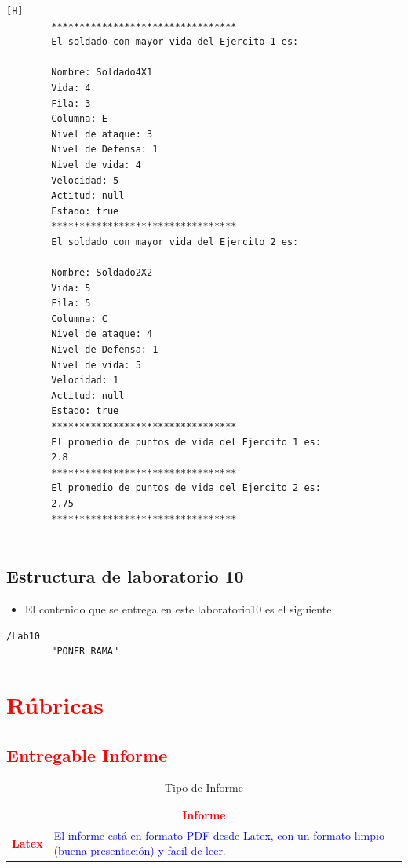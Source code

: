 \documentclass{article}
\begin{document}
	\begin{lstlisting}[language=bash,caption={Ejecucion:}][H]
		*********************************
		El soldado con mayor vida del Ejercito 1 es: 
		
		Nombre: Soldado4X1
		Vida: 4
		Fila: 3
		Columna: E
		Nivel de ataque: 3
		Nivel de Defensa: 1
		Nivel de vida: 4
		Velocidad: 5
		Actitud: null
		Estado: true
		*********************************
		El soldado con mayor vida del Ejercito 2 es: 
		
		Nombre: Soldado2X2
		Vida: 5
		Fila: 5
		Columna: C
		Nivel de ataque: 4
		Nivel de Defensa: 1
		Nivel de vida: 5
		Velocidad: 1
		Actitud: null
		Estado: true
		*********************************
		El promedio de puntos de vida del Ejercito 1 es: 
		2.8
		*********************************
		El promedio de puntos de vida del Ejercito 2 es: 
		2.75
		*********************************
		
	\end{lstlisting}
	\subsection{Estructura de laboratorio 10}
	\begin{itemize}	
		\item El contenido que se entrega en este laboratorio10 es el siguiente:
	\end{itemize}
	\begin{lstlisting}[style=ascii-tree]
	/Lab10	
		"PONER RAMA"

	\end{lstlisting}    
	\section{\textcolor{red}{Rúbricas}}
	
	\subsection{\textcolor{red}{Entregable Informe}}
	\begin{table}[H]
		\caption{Tipo de Informe}
		\setlength{\tabcolsep}{0.5em} %
		{\renewcommand{\arraystretch}{1.5}%
		\begin{tabular}{|p{3cm}|p{12cm}|}
			\hline
			\multicolumn{2}{|c|}{\textbf{\textcolor{red}{Informe}}}  \\
			\hline 
			\textbf{\textcolor{red}{Latex}} & \textcolor{blue}{El informe está en formato PDF desde Latex,  con un formato limpio (buena presentación) y facil de leer.}   \\ 
			\hline 
			
			
		\end{tabular}
	}
	\end{table}
	
\end{document}
